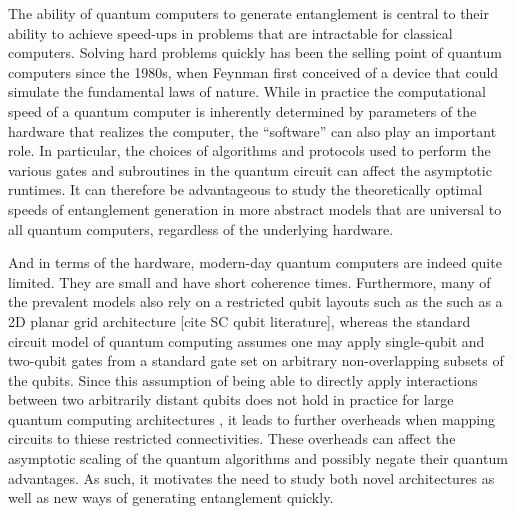 The ability of quantum computers to generate entanglement is central to their ability to achieve speed-ups in problems that are intractable for classical computers.
Solving hard problems quickly has been the selling point of quantum computers since the 1980s, when Feynman first conceived of a device that could simulate the fundamental laws of nature. %
While in practice the computational speed of a quantum computer is inherently determined by parameters of the hardware that realizes the computer, the ``software'' can also play an important role.
In particular, the choices of algorithms and protocols used to perform the various gates and subroutines in the quantum circuit can affect the asymptotic runtimes.
It can therefore be advantageous to study the theoretically optimal speeds of entanglement generation in more abstract models that are universal to all quantum computers, regardless of the underlying hardware.

And in terms of the hardware, modern-day quantum computers are indeed quite limited. They are small and have short coherence times. Furthermore, many of the prevalent models also rely on a restricted qubit layouts such as the such as a 2D planar grid architecture [cite SC qubit literature], whereas the standard circuit model of quantum computing assumes one may apply single-qubit and two-qubit gates from a standard gate set on arbitrary non-overlapping subsets of the qubits.
Since this assumption of being able to directly apply interactions between two arbitrarily distant qubits does not hold in practice for large quantum computing architectures \cite{Monroe2014,Linke2017,Bapat2018,Childs2019c,Schoute2022}, it leads to further overheads when mapping circuits to thiese restricted connectivities.
These overheads can affect the asymptotic scaling of the quantum algorithms and possibly negate their quantum advantages.
As such, it motivates the need to study both novel architectures as well as new ways of generating entanglement quickly.

